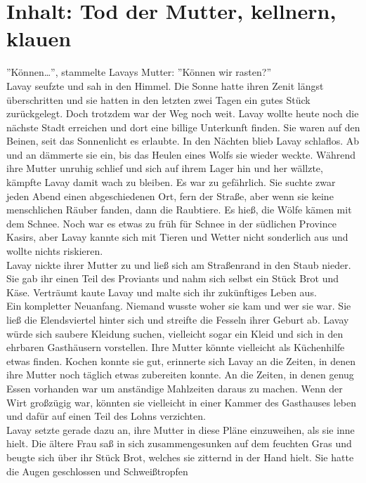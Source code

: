 \chapter{Inhalt: Tod der Mutter, kellnern, klauen}


''Können…'', stammelte Lavays Mutter: ''Können wir rasten?''\\
Lavay seufzte und sah in den Himmel. Die Sonne hatte ihren Zenit längst überschritten und sie 
hatten in den letzten zwei Tagen ein gutes Stück zurückgelegt. Doch trotzdem war der Weg noch weit. 
Lavay wollte heute noch die nächste Stadt erreichen und dort eine billige Unterkunft finden. Sie 
waren auf den Beinen, seit das Sonnenlicht es erlaubte. In den Nächten blieb Lavay schlaflos. Ab 
und an dämmerte sie ein, bis das Heulen eines Wolfs sie wieder weckte. Während ihre Mutter unruhig 
schlief und sich auf ihrem Lager hin und her wällzte, kämpfte Lavay damit wach zu bleiben. Es war 
zu gefährlich. Sie suchte zwar jeden Abend einen abgeschiedenen Ort, fern der Straße, aber wenn sie 
keine menschlichen Räuber fanden, dann die Raubtiere. Es hieß, die Wölfe kämen mit dem Schnee. Noch 
war es etwas zu früh für Schnee in der südlichen Province Kasirs, aber Lavay kannte sich mit Tieren 
und Wetter nicht sonderlich aus und wollte nichts riskieren.\\
Lavay nickte ihrer Mutter zu und ließ sich am Straßenrand in den Staub nieder. Sie gab ihr einen 
Teil des Proviants und nahm sich selbst ein Stück Brot und Käse. Verträumt kaute Lavay und malte 
sich ihr zukünftiges Leben aus.\\
Ein kompletter Neuanfang. Niemand wusste woher sie kam und wer sie war. Sie ließ die Elendsviertel 
hinter sich und streifte die Fesseln ihrer Geburt ab. Lavay würde sich saubere Kleidung suchen, 
vielleicht sogar ein Kleid und sich in den ehrbaren Gasthäusern vorstellen. Ihre Mutter könnte 
vielleicht als Küchenhilfe etwas finden. Kochen konnte sie gut, erinnerte sich Lavay an die Zeiten, 
in denen ihre Mutter noch täglich etwas zubereiten konnte. An die Zeiten, in denen genug Essen 
vorhanden war um anständige Mahlzeiten daraus zu machen. Wenn der Wirt großzügig war, könnten sie 
vielleicht in einer Kammer des Gasthauses leben und dafür auf einen Teil des Lohns verzichten.\\
Lavay setzte gerade dazu an, ihre Mutter in diese Pläne einzuweihen, als sie inne hielt. Die ältere 
Frau saß in sich zusammengesunken auf dem feuchten Gras und beugte sich über ihr Stück Brot, 
welches sie zitternd in der Hand hielt. Sie hatte die Augen geschlossen und Schweißtropfen 
